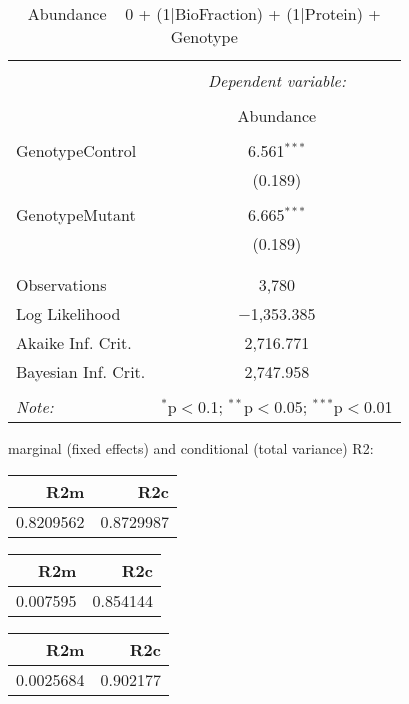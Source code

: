 \documentclass[11pt]{report}
\begin{document}
\begin{table}[!htbp] \centering 
  \caption{Abundance ~ 0 + (1|BioFraction) + (1|Protein) + Genotype} 
  \label{} 
\begin{tabular}{@{\extracolsep{5pt}}lc} 
\\[-1.8ex]\hline 
\hline \\[-1.8ex] 
 & \multicolumn{1}{c}{\textit{Dependent variable:}} \\ 
\cline{2-2} 
\\[-1.8ex] & Abundance \\ 
\hline \\[-1.8ex] 
 GenotypeControl & 6.561$^{***}$ \\ 
  & (0.189) \\ 
  & \\ 
 GenotypeMutant & 6.665$^{***}$ \\ 
  & (0.189) \\ 
  & \\ 
\hline \\[-1.8ex] 
Observations & 3,780 \\ 
Log Likelihood & $-$1,353.385 \\ 
Akaike Inf. Crit. & 2,716.771 \\ 
Bayesian Inf. Crit. & 2,747.958 \\ 
\hline 
\hline \\[-1.8ex] 
\textit{Note:}  & \multicolumn{1}{r}{$^{*}$p$<$0.1; $^{**}$p$<$0.05; $^{***}$p$<$0.01} \\ 
\end{tabular} 
\end{table} 
marginal (fixed effects) and conditional (total variance) R2:

\begin{tabular}{r|r}
\hline
R2m & R2c\\
\hline
0.8209562 & 0.8729987\\
\hline
\end{tabular}

\begin{tabular}{r|r}
\hline
R2m & R2c\\
\hline
0.007595 & 0.854144\\
\hline
\end{tabular}

\begin{tabular}{r|r}
\hline
R2m & R2c\\
\hline
0.0025684 & 0.902177\\
\hline
\end{tabular}
\end{document}
